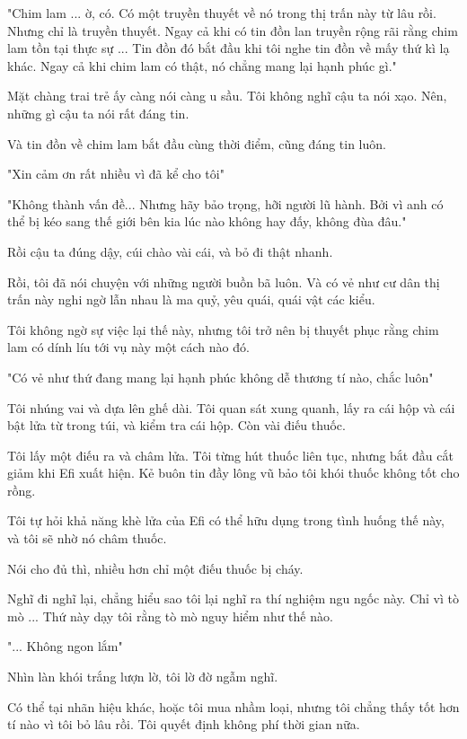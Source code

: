"Chim lam ... ờ, có. Có một truyền thuyết về nó trong thị trấn này từ lâu rồi. Nhưng chỉ là truyền thuyết. Ngay cả khi có tin đồn lan truyền rộng rãi rằng chim lam tồn tại thực sự ... Tin đồn đó bắt đầu khi tôi nghe tin đồn về mấy thứ kì lạ khác. Ngay cả khi chim lam có thật, nó chẳng mang lại hạnh phúc gì."

Mặt chàng trai trẻ ấy càng nói càng u sầu. Tôi không nghĩ cậu ta nói xạo. Nên, những gì cậu ta nói rất đáng tin.

Và tin đồn về chim lam bắt đầu cùng thời điểm, cũng đáng tin luôn.

"Xin cảm ơn rất nhiều vì đã kể cho tôi"

"Không thành vấn đề... Nhưng hãy bảo trọng, hỡi người lũ hành. Bởi vì anh có thể bị kéo sang thế giới bên kia lúc nào không hay đấy, không đùa đâu."

Rồi cậu ta đúng dậy, cúi chào vài cái, và bỏ đi thật nhanh.

Rồi, tôi đã nói chuyện với những người buồn bã luôn. Và có vẻ như cư dân thị trấn này nghi ngờ lẫn nhau là ma quỷ, yêu quái, quái vật các kiểu.

Tôi không ngờ sự việc lại thế này, nhưng tôi trở nên bị thuyết phục rằng chim lam có dính líu tới vụ này một cách nào đó.

"Có vẻ như thứ đang mang lại hạnh phúc không dễ thương tí nào, chắc luôn"

Tôi nhúng vai và dựa lên ghế dài. Tôi quan sát xung quanh, lấy ra cái hộp và cái bật lửa từ trong túi, và kiểm tra cái hộp. Còn vài điếu thuốc.

Tôi lấy một điếu ra và châm lửa. Tôi từng hút thuốc liên tục, nhưng bắt đầu cắt giảm khi Efi xuất hiện. Kẻ buôn tin đầy lông vũ bảo tôi khói thuốc không tốt cho rồng. 

Tôi tự hỏi khả năng khè lửa của Efi có thể hữu dụng trong tình huống thế này, và tôi sẽ nhờ nó châm thuốc. 

Nói cho đủ thì, nhiều hơn chỉ một điếu thuốc bị cháy.

Nghĩ đi nghĩ lại, chẳng hiểu sao tôi lại nghĩ ra thí nghiệm ngu ngốc này. Chỉ vì tò mò ... Thứ này dạy tôi rằng tò mò nguy hiểm như thế nào.

"... Không ngon lắm"

Nhìn làn khói trắng lượn lờ, tôi lờ đờ ngẫm nghĩ.

Có thể tại nhãn hiệu khác, hoặc tôi mua nhầm loại, nhưng tôi chẳng thấy tốt hơn tí nào vì tôi bỏ lâu rồi. Tôi quyết định không phí thời gian nữa.

